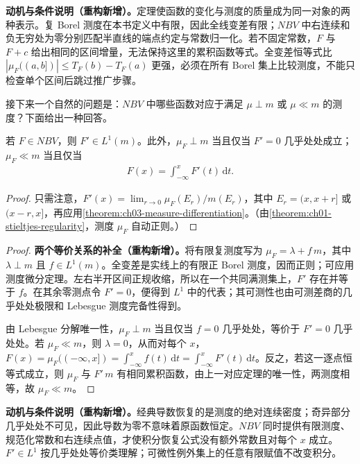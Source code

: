 \documentclass[../../main.tex]{subfiles}%
\begin{document}
\begin{remark}
\textbf{动机与条件说明（重构新增）。}定理使函数的变化与测度的质量成为同一对象的两种表示。复 Borel 测度在本书定义中有限，因此全线变差有限；$NBV$ 中右连续和负无穷处为零分别匹配半直线的端点约定与常数归一化。若不固定常数，$F$ 与 $F+c$ 给出相同的区间增量，无法保持这里的累积函数等式。全变差恒等式比 $|\mu_F((a,b])|\le T_F(b)-T_F(a)$ 更强，必须在所有 Borel 集上比较测度，不能只检查单个区间后跳过推广步骤。
\end{remark}

接下来一个自然的问题是：$NBV$ 中哪些函数对应于满足 $\mu\perp m$ 或 $\mu\ll m$ 的测度？下面给出一种回答。
\begin{proposition}\label{proposition:ch03-nbv-singular-absolute}
若 $F\in NBV$，则 $F'\in L^1(m)$。此外，$\mu_F\perp m$ 当且仅当 $F'=0$ 几乎处处成立；$\mu_F\ll m$ 当且仅当
\begin{align*}
F(x)=\int_{-\infty}^xF'(t)\,\mathrm dt.
\end{align*}
\end{proposition}
\begin{proof}
只需注意，$F'(x)=\lim_{r\to0}\mu_F(E_r)/m(E_r)$，其中 $E_r=(x,x+r]$ 或 $(x-r,x]$，再应用\cref{theorem:ch03-measure-differentiation}。（由\cref{theorem:ch01-stieltjes-regularity}，测度 $\mu_F$ 自动正则。）
\end{proof}
\begin{proof}
\textbf{两个等价关系的补全（重构新增）。}将有限复测度写为 $\mu_F=\lambda+f\,m$，其中 $\lambda\perp m$ 且 $f\in L^1(m)$。全变差是实线上的有限正 Borel 测度，因而正则；可应用测度微分定理。左右半开区间正规收缩，所以在一个共同满测集上，$F'$ 存在并等于 $f$。在其余零测点令 $F'=0$，便得到 $L^1$ 中的代表；其可测性也由可测差商的几乎处处极限和 Lebesgue 测度完备性得到。

由 Lebesgue 分解唯一性，$\mu_F\perp m$ 当且仅当 $f=0$ 几乎处处，等价于 $F'=0$ 几乎处处。若 $\mu_F\ll m$，则 $\lambda=0$，从而对每个 $x$，$F(x)=\mu_F((-\infty,x])=\int_{-\infty}^x f(t)\,\mathrm dt=\int_{-\infty}^x F'(t)\,\mathrm dt$。反之，若这一逐点恒等式成立，则 $\mu_F$ 与 $F'\,m$ 有相同累积函数，由上一对应定理的唯一性，两测度相等，故 $\mu_F\ll m$。
\end{proof}
\begin{remark}
\textbf{动机与条件说明（重构新增）。}经典导数恢复的是测度的绝对连续密度；奇异部分几乎处处不可见，因此导数为零不意味着原函数恒定。$NBV$ 同时提供有限测度、规范化常数和右连续点值，才使积分恢复公式没有额外常数且对每个 $x$ 成立。$F'\in L^1$ 按几乎处处等价类理解；可微性例外集上的任意有限赋值不改变积分。
\end{remark}
\end{document}
